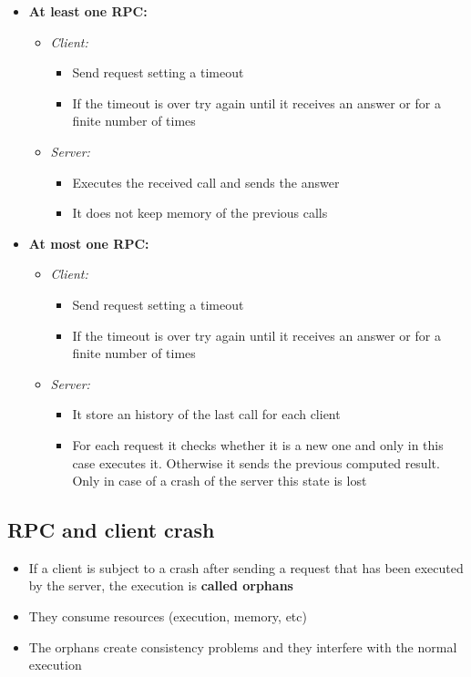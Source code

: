 \begin{itemize}
    \item \textbf{At least one RPC:}
        \begin{itemize}
            \item \textit{Client:}
                \begin{itemize}
                    \item Send request setting a timeout
                    \item If the timeout is over try again until it receives an answer or for a finite number of times
                \end{itemize}
            \item \textit{Server:}
                \begin{itemize}
                    \item Executes the received call and sends the answer
                    \item It does not keep memory of the previous calls
                \end{itemize}
        \end{itemize}
    \item \textbf{At most one RPC:}
        \begin{itemize}
            \item \textit{Client:}
                \begin{itemize}
                    \item Send request setting a timeout
                    \item If the timeout is over try again until it receives an answer or for a finite number of times
                \end{itemize}
            \item \textit{Server:}
                \begin{itemize}
                    \item It store an history of the last call for each client
                    \item For each request it checks whether it is a new one and only in this case executes it. Otherwise it sends the previous computed result. Only in case of a crash of the server this state is lost
                \end{itemize}
        \end{itemize}
\end{itemize}

\subsection{RPC and client crash}
\begin{itemize}
    \item If a client is subject to a crash after sending a request that has been executed by the server, the execution is \textbf{called orphans}
    \item They consume resources (execution, memory, etc)
    \item The orphans create consistency problems and they interfere with the normal execution
\end{itemize}

